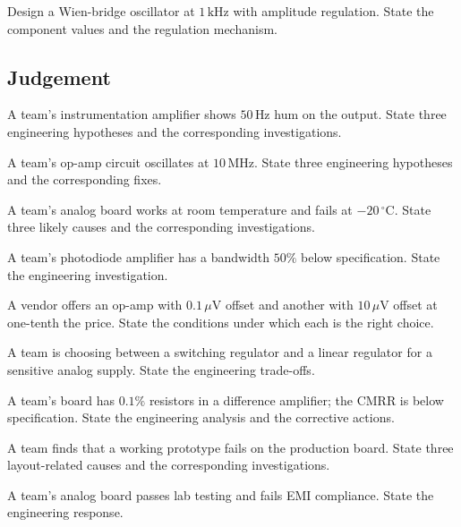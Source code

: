 \begin{exercise}
Design a Wien-bridge oscillator at $1\,\text{kHz}$ with amplitude regulation. State the component values and the regulation mechanism.
\end{exercise}

\subsection*{Judgement}

\begin{exercise}
A team's instrumentation amplifier shows $50\,\text{Hz}$ hum on the output. State three engineering hypotheses and the corresponding investigations.
\end{exercise}

\begin{exercise}
A team's op-amp circuit oscillates at $10\,\text{MHz}$. State three engineering hypotheses and the corresponding fixes.
\end{exercise}

\begin{exercise}
A team's analog board works at room temperature and fails at $-20\,^\circ\text{C}$. State three likely causes and the corresponding investigations.
\end{exercise}

\begin{exercise}
A team's photodiode amplifier has a bandwidth $50\%$ below specification. State the engineering investigation.
\end{exercise}

\begin{exercise}
A vendor offers an op-amp with $0.1\,\mu\text{V}$ offset and another with $10\,\mu\text{V}$ offset at one-tenth the price. State the conditions under which each is the right choice.
\end{exercise}

\begin{exercise}
A team is choosing between a switching regulator and a linear regulator for a sensitive analog supply. State the engineering trade-offs.
\end{exercise}

\begin{exercise}
A team's board has $0.1\%$ resistors in a difference amplifier; the CMRR is below specification. State the engineering analysis and the corrective actions.
\end{exercise}

\begin{exercise}
A team finds that a working prototype fails on the production board. State three layout-related causes and the corresponding investigations.
\end{exercise}

\begin{exercise}
A team's analog board passes lab testing and fails EMI compliance. State the engineering response.
\end{exercise}
